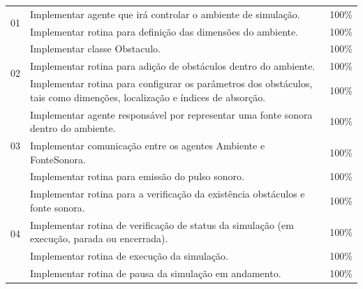\begin{center}
\begin{longtable}{|c|p{11.5cm}|l|}
\multirow{2}{*}{01} & Implementar agente que irá controlar o ambiente de simulação.                                                                   & 100\%      \\ \cline{2-3} 
                    & Implementar rotina para definição das dimensões do ambiente.                                                                    & 100\%      \\ \hline
\multirow{3}{*}{02} & Implementar classe Obstaculo.                                                                                                   & 100\%      \\ \cline{2-3} 
                    & Implementar rotina para adição de obstáculos dentro do ambiente.                                                                & 100\%      \\ \cline{2-3} 
                    & Implementar rotina para configurar os parâmetros dos obstáculos, tais como dimenções, localização e índices de absorção.        & 100\%      \\ \hline
\multirow{3}{*}{03} & Implementar agente responsável por representar uma fonte sonora dentro do ambiente.                                             & 100\%      \\ \cline{2-3} 
                    & Implementar comunicação entre os agentes Ambiente e FonteSonora.                                                                & 100\%      \\ \cline{2-3} 
                    & Implementar rotina para emissão do pulso sonoro.                                                                                & 100\%      \\ \hline
\multirow{6}{*}{04} & Implementar rotina para a verificação da existência obstáculos e fonte sonora.                                                  & 100\%      \\ \cline{2-3} 
                    & Implementar rotina de verificação de status da simulação (em execução, parada ou encerrada).                                    & 100\%      \\ \cline{2-3} 
                    & Implementar rotina de execução da simulação.                                                                                    & 100\%      \\ \cline{2-3} 
                    & Implementar rotina de pausa da simulação em andamento.                                                                          & 100\%      \\ \cline{2-3} 

\end{longtable}
\end{center}
